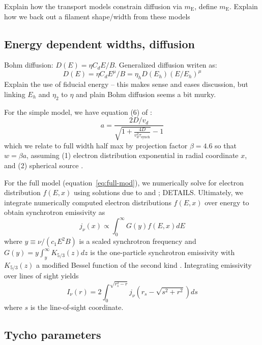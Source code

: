 \documentclass[iop, apj, numberedappendix, twocolappendix]{emulateapj}
\newcommand*{\mt}{\mathrm}
\newcommand*{\mE}{m_\mathrm{E}}
\begin{document}
Explain how the transport models constrain diffusion via $\mE$, define $\mE$.
Explain how we back out a filament shape/width from these models

\subsection{Energy dependent widths, diffusion}

Bohm diffusion: $D(E) = \eta C_d E / B$. Generalized diffusion writen as:
\[
    D(E) = \eta C_d E^\mu / B = \eta_h D(E_h) (E/E_h)^\mu
\]
Explain the use of fiducial energy -- this makes sense and eases discussion,
but linking $E_h$ and $\eta_2$ to $\eta$ and plain Bohm diffusion seems a bit
murky.

For the simple model, we have equation (6) of :
\begin{equation} \label{eq:simp-width}
    a = \frac{2 D / v_d}{ \sqrt{ 1 + \frac{4D}{v_d^2 \tau_{\mt{synch}}}} - 1}
\end{equation}
which we relate to full width half max by projection factor $\beta = 4.6$
so that $w = \beta a$, assuming (1) electron distribution exponential in radial
coordinate $x$, and (2) spherical source 
\citep{ballet2006}.

For the full model (equation~\eqref{eq:full-mod}), we numerically solve for
electron distribution $f(E,x)$ using solutions due to \citet{lerche1980} and
\citet{rettig2012}; DETAILS.
Ultimately, we integrate numerically computed electron distributions $f(E,x)$
over energy to obtain synchrotron emissivity as
\[
    j_{\nu}(x) \propto \int_0^\infty G(y) f(E,x) dE
\]
where $y \equiv \nu/(c_1 E^2 B)$ is a scaled synchrotron frequency and
$G(y) = y \int_y^\infty K_{5/3}(z) dz$ is the one-particle synchrotron
emissivity with $K_{5/3}(z)$ a modified Bessel function of the second kind
\citep{pacholczyk1970}.  Integrating emissivity over lines of sight yields
\begin{equation} \label{eq:intensity}
    I_{\nu}(r) = 2 \int_0^{\sqrt{r_s^2 - r}}
                    j_{\nu} \left( r_s - \sqrt{s^2 + r^2} \right) ds
\end{equation}
where $s$ is the line-of-sight coordinate.

\subsection{Tycho parameters}
\end{document}

